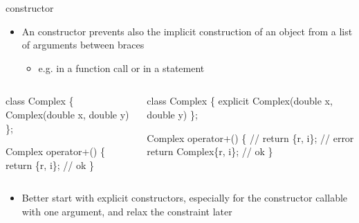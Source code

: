 \begin{frame}[fragile]{ constructor \insertcontinuationtext}

  \begin{itemize}
  \item An  constructor prevents also the implicit construction
    of an object from a list of arguments between braces
    \begin{itemize}
    \item e.g. in a function call or in a  statement
    \end{itemize}
  \end{itemize}

  \begin{columns}[t]
    \begin{column}{.45\textwidth}
      \begin{codeblock}
class Complex \{
  \ddd
  Complex(double x, double y) \ddd
\};

Complex operator+(\ddd)
\{
  \ddd
  return \{r, i\}; // ok
\}\end{codeblock}

    \end{column}

    \begin{column}{.55\textwidth}
      \begin{codeblock}
class Complex \{
  \ddd
  \alert{explicit} Complex(double x, double y) \ddd
\};

Complex operator+(\ddd)
\{
  \ddd
  // return \{r, i\}; // error
  return Complex\{r, i\}; // ok
\}\end{codeblock}

    \end{column}

  \end{columns}

  \begin{itemize}
  \item<2> Better start with explicit constructors, especially for the
    constructor callable with one argument, and relax the constraint later
  \end{itemize}

\end{frame}

